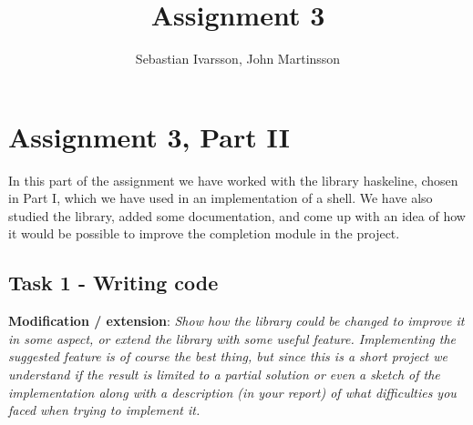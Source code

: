 \documentclass[11pt,a4paper]{article}
\begin{document}
\pagestyle{fancy}

\renewcommand{\headrulewidth}{0pt} \setlength{\headsep}{30pt}
\setlength{\headheight}{30pt}

\title{Assignment 3}
\author{Sebastian Ivarsson, John Martinsson}
\maketitle
\thispagestyle{fancy}


%


\section{Assignment 3, Part II}
In this part of the assignment we have worked with the library haskeline, chosen
in Part I, which we have used in an implementation of a shell. We have also
studied the library, added some documentation, and come up with an idea of how
it would be possible to improve the completion module in the project.

\subsection{Task 1 - Writing code}

\textbf{Modification / extension}: \textit{Show how the library could be changed to improve it in
some aspect, or extend the library with some useful feature. Implementing the
suggested feature is of course the best thing, but since this is a short project
we understand if the result is limited to a partial solution or even a sketch of
the implementation along with a description (in your report) of what
difficulties you faced when trying to implement it.}
\end{document}
